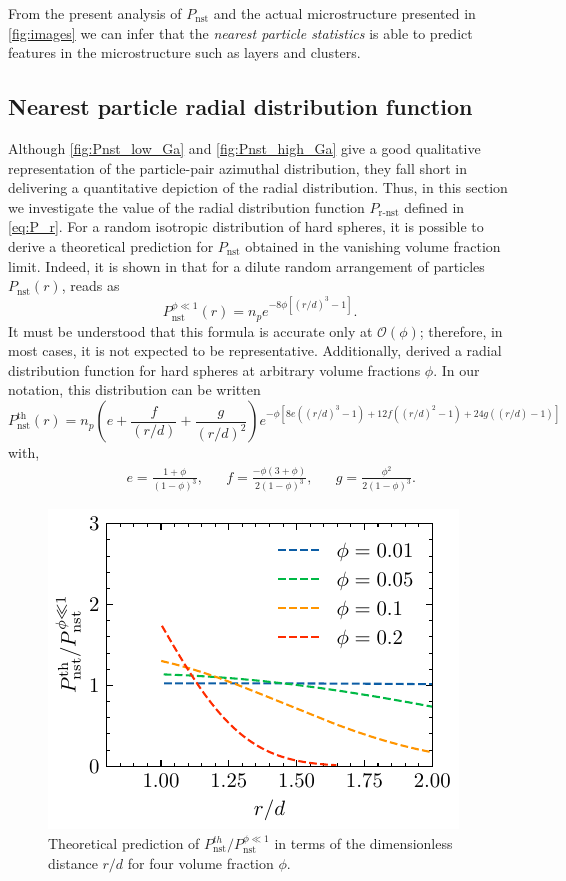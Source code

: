 From the present analysis of $P_\text{nst}$ and the actual microstructure presented in \ref{fig:images} we can infer that the \textit{nearest particle statistics} is able to predict features in the microstructure such as layers and clusters. 


\subsection{Nearest particle radial distribution function }

Although \ref{fig:Pnst_low_Ga} and \ref{fig:Pnst_high_Ga} give a good qualitative representation of the particle-pair azimuthal distribution, they fall short in delivering a quantitative depiction of the radial distribution.
Thus, in this section we investigate the value of the radial distribution function $P_\text{r-nst}$ defined in \ref{eq:P_r}. 
For a random isotropic distribution of hard spheres, it is possible to derive a theoretical prediction for $P_\text{nst}$ obtained in the vanishing volume fraction limit. 
Indeed, it is shown in \citet{zhang2021ensemble} that for a dilute random arrangement of particles $P_\text{nst}(r)$, reads as
\begin{equation}
    P_\text{nst}^{\phi \ll 1}(r) = n_p e^{- 8\phi\left[(r/d)^3-1\right]}.
    \label{eq:Pnst_dilute}
\end{equation}
It must be understood that this formula is accurate only at $\mathcal{O}(\phi)$; therefore, in most cases, it is not expected to be representative.
Additionally, \citet{torquato1990nearest} derived a radial distribution function for hard spheres at arbitrary volume fractions $\phi$. In our notation, this distribution can be written
\begin{equation}
    P_\text{nst}^\text{th}(r) = 
        n_p\left(e+\frac{f}{(r/d)} +\frac{g}{(r/d)^2}\right)
    e^{-\phi\left[8e\left((r/d)^3-1\right)+12 f\left((r/d)^2-1\right)+24g\left((r/d)-1\right)\right]}
    \label{eq:torquato}
\end{equation}
with, 
\begin{align*}
    && e= \frac{1+\phi}{(1-\phi)^3},
    && f= \frac{-\phi (3+\phi)}{2(1-\phi)^3},
    && g= \frac{\phi^2}{2(1-\phi)^3}.
\end{align*}
\begin{figure}
    \centering
    \includegraphics[height=0.3\textwidth]{image/HOMOGENEOUS_final/Dist/Theory.pdf}
    \caption{
        Theoretical prediction of $P_\text{nst}^{th}/P_\text{nst}^{\phi \ll 1}$ in terms of the dimensionless distance $r/d$ for four volume fraction $\phi$. 
    }
    \label{fig:torquato}
\end{figure}
